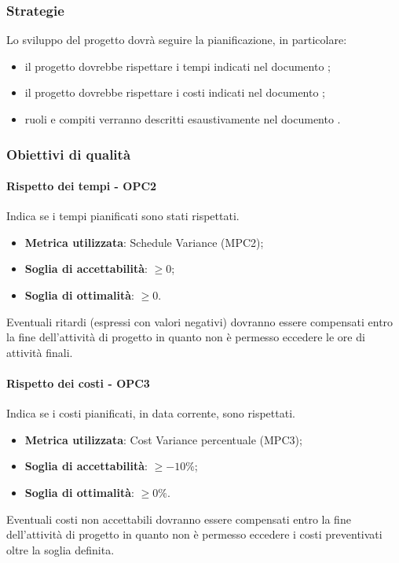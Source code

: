 \documentclass[PdQ.tex]{subfiles}
\begin{document}
		\subsubsection{Strategie}
			Lo sviluppo del progetto dovrà seguire la pianificazione, in particolare:
			\begin{itemize}
				\item il progetto dovrebbe rispettare i tempi indicati nel documento \PPdocRP{};
				\item il progetto dovrebbe rispettare i costi indicati nel documento \PPdocRP{};
				\item ruoli e compiti verranno descritti esaustivamente nel documento \PPdocRP{}.
			\end{itemize}
		
		\subsubsection{Obiettivi di qualità}
			\paragraph{Rispetto dei tempi - OPC2}
				Indica se i tempi pianificati sono stati rispettati.
				\begin{itemize}
					\item \textbf{Metrica utilizzata}: Schedule Variance (MPC2);
					\item \textbf{Soglia di accettabilità}: \begin{math}\geq 0\end{math};
					\item \textbf{Soglia di ottimalità}: \begin{math}\geq 0\end{math}.
				\end{itemize}
				Eventuali ritardi (espressi con valori negativi) dovranno essere compensati entro la fine dell'attività di progetto
				in quanto non è permesso eccedere le ore di attività finali.
			
			\paragraph{Rispetto dei costi - OPC3}
				Indica se i costi pianificati, in data corrente, sono rispettati.
				\begin{itemize}
					\item \textbf{Metrica utilizzata}: Cost Variance percentuale (MPC3);
					\item \textbf{Soglia di accettabilità}: \begin{math}\geq -10\%\end{math};
					\item \textbf{Soglia di ottimalità}: \begin{math}\geq 0\%\end{math}.
				\end{itemize}
				Eventuali costi non accettabili dovranno essere compensati entro la fine dell'attività di progetto in quanto non è
				permesso eccedere i costi preventivati oltre la soglia definita.
			
\end{document}
